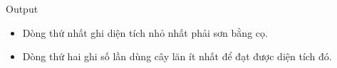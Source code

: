 Output
\begin{itemize}
	\item     Dòng thứ nhất ghi diện tích nhỏ nhất phải sơn bằng cọ.   
	\item     Dòng thứ hai ghi số lần dùng cây lăn ít nhất để đạt được diện tích đó.   
\end{itemize}